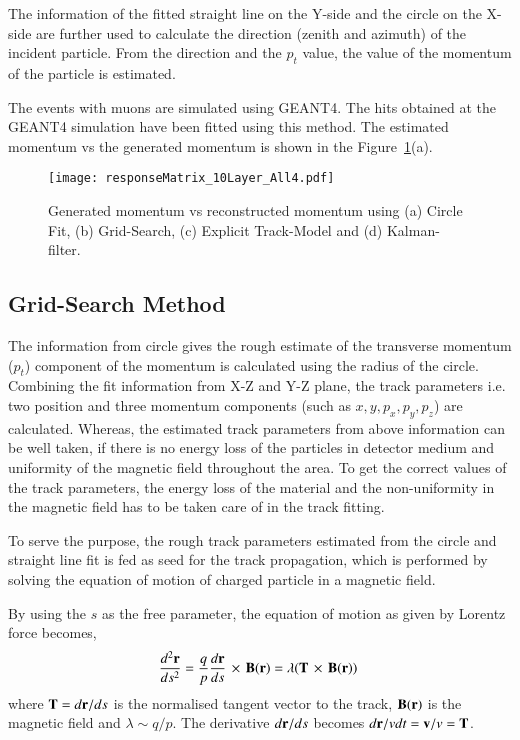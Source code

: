 The information of the fitted straight line on the Y-side and the circle
on the X-side are further used to calculate the direction (zenith and
azimuth) of the incident particle. From the direction and the $p_t$
value, the value of the momentum of the particle is estimated.

The events with muons are simulated using GEANT4. The hits obtained
at the GEANT4 simulation have been fitted using this method.
The estimated momentum vs the generated momentum is shown in the
Figure~\ref{fig:recomom}(a).
\begin{figure}[h]
  \centering
  \texttt{[image: responseMatrix\_10Layer\_All4.pdf]}
  \caption{Generated momentum vs reconstructed momentum using
    (a) Circle Fit, (b) Grid-Search, (c) Explicit Track-Model
    and (d) Kalman-filter.}
  \label{fig:recomom}
\end{figure}


\subsection{Grid-Search Method}
The information from circle gives the rough estimate of the transverse
momentum ($p_{t}$) component of the momentum is calculated using the
radius of the circle. Combining the fit information from X-Z and Y-Z
plane, the track parameters i.e. two position and three momentum
components (such as $x,y,p_{x},p_{y},p_{z}$) are calculated. Whereas, the
estimated track parameters from above information can be well taken,
if there is no energy loss of the particles in detector medium and
uniformity of the magnetic field throughout the area. To get the
correct values of the track parameters, the energy loss of the
material and the non-uniformity in the magnetic field has to be taken
care of in the track fitting.

To serve the purpose, the rough track parameters estimated from the
circle and straight line fit is fed as seed for the track
propagation, which is performed by solving the equation of motion of
charged particle in a magnetic field.

By using the $s$ as the free parameter, the equation of motion as given
by Lorentz force becomes,
\begin{equation}
  \frac{d^{2}{\bf r}}{ds^{2}}=\frac{q}{p}\frac{d{\bf r}}{ds}\,\times\,{\bf B(r)} = \lambda({\bf T}\,\times\,{\bf B(r)})~
  \label{eqn:lorentzeqn}
\end{equation}
where ${\bf T} = d{\bf r}/ds$ is the normalised tangent vector to the
track, ${\bf B(r)}$ is the magnetic field and $\lambda\sim q/p$. The
derivative $d{\bf r}/ds$ becomes $d{\bf r}/vdt = {\bf v}/v = {\bf T}$.

